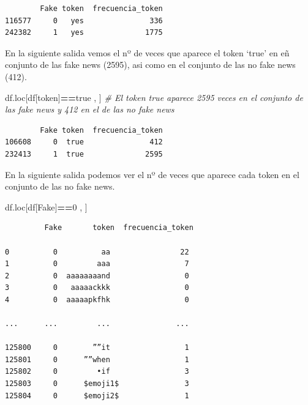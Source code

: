 \documentclass[
  11pt,
  a4paper,
]{article}
\newenvironment{Shaded}{\begin{snugshade}}{\end{snugshade}}
\newcommand{\CommentTok}[1]{\textcolor[rgb]{0.56,0.35,0.01}{\textit{#1}}}
\newcommand{\DecValTok}[1]{\textcolor[rgb]{0.00,0.00,0.81}{#1}}
\newcommand{\NormalTok}[1]{#1}
\newcommand{\OperatorTok}[1]{\textcolor[rgb]{0.81,0.36,0.00}{\textbf{#1}}}
\newcommand{\StringTok}[1]{\textcolor[rgb]{0.31,0.60,0.02}{#1}}
\begin{document}
\begin{verbatim}
        Fake token  frecuencia_token
116577     0   yes               336
242382     1   yes              1775
\end{verbatim}

En la siguiente salida vemos el nº de veces que aparece el token `true'
en eñ conjunto de las fake news (2595), asi como en el conjunto de las
no fake news (412).

\begin{Shaded}
\begin{Highlighting}[]
\NormalTok{df.loc[df[}\StringTok{\textquotesingle{}token\textquotesingle{}}\NormalTok{]}\OperatorTok{==}\StringTok{\textquotesingle{}true\textquotesingle{}}\NormalTok{ , ] }\CommentTok{\# El token \textquotesingle{}true\textquotesingle{} aparece 2595 veces en el conjunto de las fake news y 412 en el de las no fake news}
\end{Highlighting}
\end{Shaded}

\begin{verbatim}
        Fake token  frecuencia_token
106608     0  true               412
232413     1  true              2595
\end{verbatim}

En la siguiente salida podemos ver el nº de veces que aparece cada token
en el conjunto de las no fake news.

\begin{Shaded}
\begin{Highlighting}[]
\NormalTok{df.loc[df[}\StringTok{\textquotesingle{}Fake\textquotesingle{}}\NormalTok{]}\OperatorTok{==}\DecValTok{0}\NormalTok{ , ] }
\end{Highlighting}
\end{Shaded}

\begin{verbatim}
         Fake       token  frecuencia_token
         
0          0          aa                22
1          0         aaa                 7
2          0  aaaaaaaand                 0
3          0   aaaaackkk                 0
4          0  aaaaapkfhk                 0

...      ...         ...               ...

125800     0        ””it                 1
125801     0      ””when                 1
125802     0         •if                 3
125803     0      $emoji1$               3
125804     0      $emoji2$               1
\end{verbatim}
\end{document}
